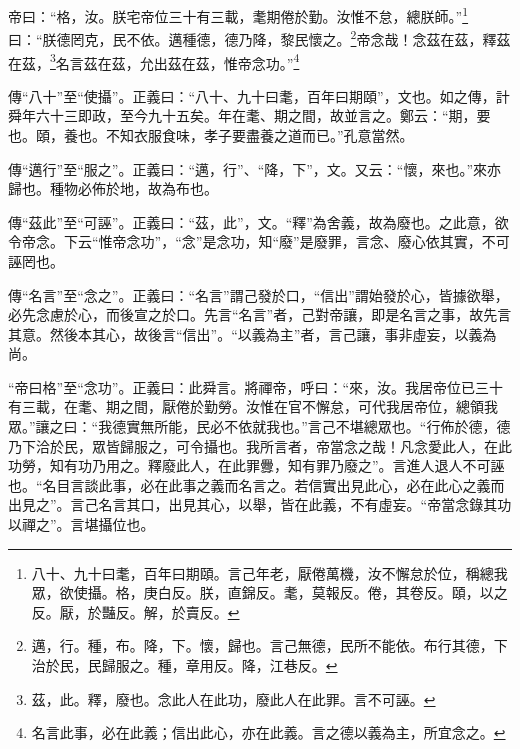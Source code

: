 帝曰：“格，汝。朕宅帝位三十有三載，耄期倦於勤。汝惟不怠，總朕師。”\footnote{八十、九十曰耄，百年曰期頤。言己年老，厭倦萬機，汝不懈怠於位，稱總我眾，欲使攝。格，庚白反。朕，直錦反。耄，莫報反。倦，其卷反。頤，以之反。厭，於豔反。解，於賣反。}曰：“朕德罔克，民不依。邁種德，德乃降，黎民懷之。\footnote{邁，行。種，布。降，下。懷，歸也。言己無德，民所不能依。布行其德，下治於民，民歸服之。種，章用反。降，江巷反。}帝念哉！念茲在茲，釋茲在茲，\footnote{茲，此。釋，廢也。念此人在此功，廢此人在此罪。言不可誣。}名言茲在茲，允出茲在茲，惟帝念功。”\footnote{名言此事，必在此義；信出此心，亦在此義。言之德以義為主，所宜念之。}

{\noindent\zhuan{}\fzbyks 傳“八十”至“使攝”。正義曰：“八十、九十曰耄，百年曰期頤”，文也。如之傳，計舜年六十三即政，至今九十五矣。年在耄、期之間，故並言之。鄭云：“期，要也。頤，養也。不知衣服食味，孝子要盡養之道而已。”孔意當然。 \par}

{\noindent\zhuan{}\fzbyks 傳“邁行”至“服之”。正義曰：“邁，行”、“降，下”，文。又云：“懷，來也。”來亦歸也。種物必佈於地，故為布也。 \par}

{\noindent\zhuan{}\fzbyks 傳“茲此”至“可誣”。正義曰：“茲，此”，文。“釋”為舍義，故為廢也。之此意，欲令帝念。下云“惟帝念功”，“念”是念功，知“廢”是廢罪，言念、廢心依其實，不可誣罔也。 \par}

{\noindent\zhuan{}\fzbyks 傳“名言”至“念之”。正義曰：“名言”謂己發於口，“信出”謂始發於心，皆據欲舉，必先念慮於心，而後宣之於口。先言“名言”者，己對帝讓，即是名言之事，故先言其意。然後本其心，故後言“信出”。“以義為主”者，言己讓，事非虛妄，以義為尚。 \par}

{\noindent\shu{}\fzkt “帝曰格”至“念功”。正義曰：此舜言。將禪帝，呼曰：“來，汝。我居帝位已三十有三載，在耄、期之間，厭倦於勤勞。汝惟在官不懈怠，可代我居帝位，總領我眾。”讓之曰：“我德實無所能，民必不依就我也。”言己不堪總眾也。“行佈於德，德乃下洽於民，眾皆歸服之，可令攝也。我所言者，帝當念之哉！凡念愛此人，在此功勞，知有功乃用之。釋廢此人，在此罪釁，知有罪乃廢之”。言進人退人不可誣也。“名目言談此事，必在此事之義而名言之。若信實出見此心，必在此心之義而出見之”。言己名言其口，出見其心，以舉，皆在此義，不有虛妄。“帝當念錄其功以禪之”。言堪攝位也。 \par}

